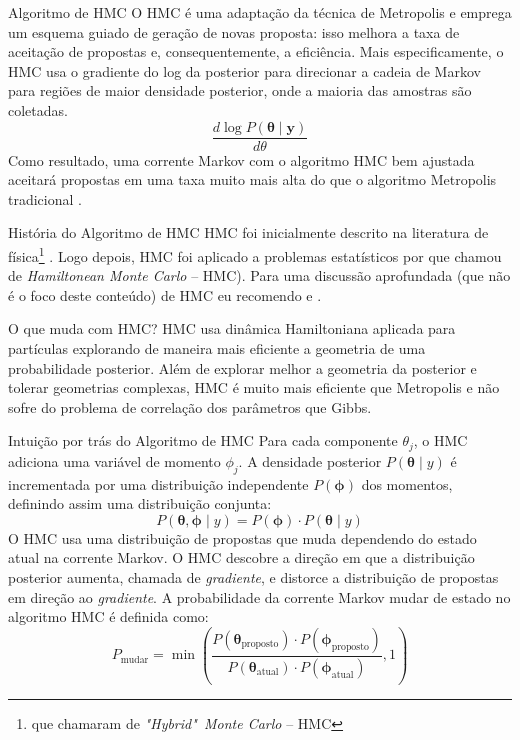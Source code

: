 \begin{frame}{Algoritmo de HMC}
  O HMC é uma adaptação da técnica de Metropolis e emprega um esquema guiado de
  geração de novas proposta: isso melhora a taxa de aceitação de propostas e,
  consequentemente, a eficiência.
  \vfill
  Mais especificamente, o HMC usa o gradiente do log da posterior para direcionar
  a cadeia de Markov para regiões de maior densidade posterior,
  onde a maioria das amostras são coletadas.
  $$
  \frac{d \log P(\boldsymbol{\theta} \mid \boldsymbol{y})}{d \theta}
  $$
  Como resultado, uma corrente Markov com o algoritmo HMC bem ajustada aceitará
  propostas em uma taxa muito mais alta do que o algoritmo Metropolis tradicional
  \parencite{robertsWeakConvergenceOptimal1997, beskosOptimalTuningHybrid2013}.
\end{frame}

\begin{frame}{História do Algoritmo de HMC}
  HMC foi inicialmente descrito na literatura de física\footnote{que chamaram de \textit{"Hybrid"~Monte Carlo} -- HMC}
  \parencite{duaneHybridMonteCarlo1987}.
  \vfill
  Logo depois, HMC foi aplicado a problemas estatísticos por
  \textcite{nealImprovedAcceptanceProcedure1994} que chamou de \textit{Hamiltonean Monte Carlo}
  -- HMC).
  \vfill
  Para uma discussão aprofundada (que não é o foco deste conteúdo) de HMC eu recomendo
  \textcite{neal2011mcmc} e \textcite{betancourtConceptualIntroductionHamiltonian2017}.
\end{frame}

\begin{frame}{O que muda com HMC?}
  HMC usa dinâmica Hamiltoniana aplicada para partículas explorando de maneira mais
  eficiente a geometria de uma probabilidade posterior.
  \vfill
  Além de explorar melhor a geometria da posterior e tolerar geometrias complexas,
  HMC é muito mais eficiente que Metropolis e não sofre do problema de correlação
  dos parâmetros que Gibbs.
\end{frame}

\begin{frame}{Intuição por trás do Algoritmo de HMC}
  \small
  Para cada componente $\theta_j$, o HMC adiciona uma variável de momento
  $\phi_j$. A densidade posterior $P(\boldsymbol{\theta} \mid y)$ é incrementada
  por uma distribuição independente $P(\boldsymbol{\phi})$ dos momentos,
  definindo assim uma distribuição conjunta:
  $$
  P(\boldsymbol{\theta}, \boldsymbol{\phi} \mid y) = P(\boldsymbol{\phi}) \cdot P(\boldsymbol{\theta} \mid y)
  $$
  \small
  O HMC usa uma distribuição de propostas que muda dependendo do estado atual na
  corrente Markov. O HMC descobre a direção em que a distribuição posterior aumenta,
  chamada de \textit{gradiente}, e distorce a distribuição de propostas em
  direção ao \textit{gradiente}.
  \vfill
  A probabilidade da corrente Markov mudar de estado no algoritmo HMC é definida como:
  $$
  P_{\text{mudar}} = \min\left({\frac{P(\boldsymbol{\theta}_{\text{proposto}}) \cdot P(\boldsymbol{\phi}_{\text{proposto}})}{P(\boldsymbol{\theta}_{\text{atual}})\cdot P(\boldsymbol{\phi}_{\text{atual}})}}, 1\right)
  $$
\end{frame}

